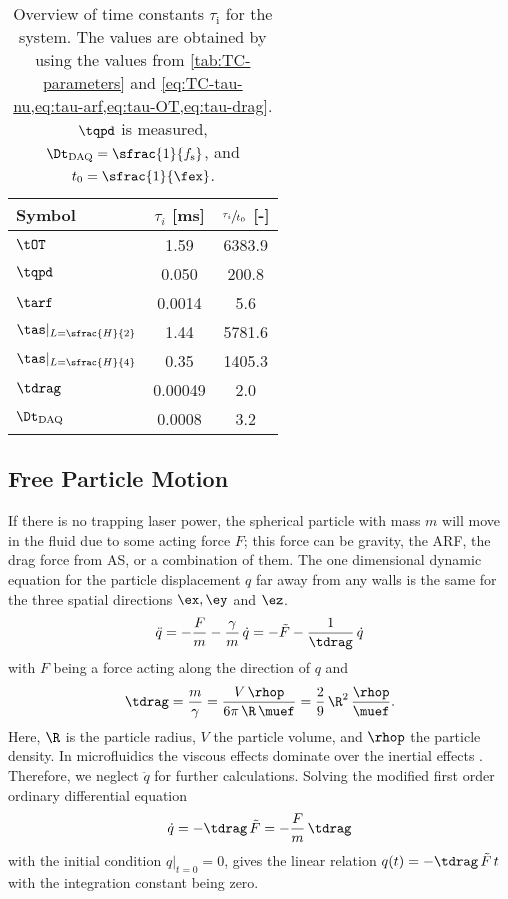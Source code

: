 \begin{table}
  \centering
  \begin{tabular}{l S[table-format=7.5]S[table-format=7.1]}
    \toprule
    \toprule
    {\bfseries Symbol} & {\bfseries $\tau_{i}$ [\si{\ms}]} & {\bfseries 
    $\sfrac{\tau_{i}}{t_{0}}$ [-]}  \\
    \midrule
    $\tOT$ & 1.59 & 6383.9 \\
    $\tqpd$ & 0.050 & 200.8 \\
    $\tarf$ & 0.0014 & 5.6 \\
    $\tas\vert_{L=\sfrac{H}{2}}$ & 1.44 & 5781.6\\
    $\tas\vert_{L=\sfrac{H}{4}}$ & 0.35 & 1405.3\\
    $\tdrag$ & 0.00049 & 2.0 \\
    \midrule
    $\Dt_{\text{DAQ}}$ & 0.0008 & 3.2 \\
    \bottomrule
    \bottomrule
    
  \end{tabular}
  \caption{Overview of time constants $\tau_{\text{i}}$ for the system. The 
    values are obtained by using the values from \cref{tab:TC-parameters} and 
    \cref{eq:TC-tau-nu,eq:tau-arf,eq:tau-OT,eq:tau-drag}. $\tqpd$ is measured, 
    $\Dt_{\text{DAQ}} = \sfrac{1}{f_{\text{s}}}$, and 
$t_{0}=\sfrac{1}{\fex}$.}\label{tab:TC-time-constants}
\end{table}

\subsection{Free Particle Motion}

If there is no trapping laser power, the spherical particle with mass $m$ will 
move in the fluid due to some acting force $F$; this force can be gravity, the 
ARF, the drag force from AS, or a combination of them. The one dimensional 
dynamic equation for the particle displacement $q$ far away from any walls is 
the same for the three spatial directions $\ex, \ey$ and $\ez$.
\begin{equation}
  \ddot{q} = - \frac{F}{m} - \frac{\gamma}{m}\,\dot{q} =
  - \tilde{F} - \frac{1}{\tdrag}\,\dot{q}
  \label{eq:TC-free-fall}
\end{equation}
with $F$ being a force acting along the direction of $q$ and
\begin{equation}
  \tdrag = \frac{m}{\gamma} = \frac{V\,\rhop}{6\pi\,\R\,\muef}
  = \frac{2}{9}\,\R^{2}\,\frac{\rhop}{\muef}.
  \label{eq:TC-tau-drag}
\end{equation}
Here, $\R$ is the particle radius, $V$ the particle volume, and $\rhop$ the 
particle density. In microfluidics the viscous effects dominate over the 
inertial effects \cite{Bruus2015}. Therefore, we neglect $\ddot{q}$ for further 
calculations. Solving the modified first order ordinary differential equation
\begin{equation}
    \dot{q}= - \tdrag\,\tilde{F} = -\frac{F}{m}\,\tdrag
  \label{eq:TC-mod-free-fall}
\end{equation}
with the initial condition $q\vert_{t=0} = 0$, gives the linear relation $q(t) 
= - \tdrag\,\tilde{F}\,t$ with the integration constant being zero.

